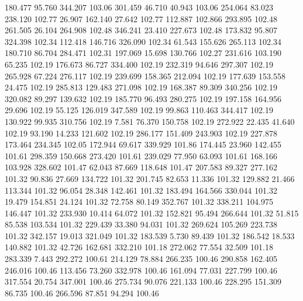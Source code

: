  180.477   95.760  344.207       103.06
 301.459   46.710   40.943       103.06
 254.064   83.023  238.120       102.77
  26.907  162.140   27.642       102.77
 112.887  102.866  293.895       102.48
 261.505   26.104  264.908       102.48
 346.241   23.410  227.673       102.48
 173.832   95.807  324.398       102.34
 112.418  146.716  326.090       102.34
  61.543  155.626  265.113       102.34
 180.710   86.704  284.471       102.31
 197.069   15.698  130.766       102.27
 231.616  103.190   65.235       102.19
 176.673   86.727  334.400       102.19
 232.319   94.646  297.307       102.19
 265.928   67.224  276.117       102.19
 239.699  158.365  212.094       102.19
 177.639  153.558   24.475       102.19
 285.813  129.483  271.098       102.19
 168.387   89.309  340.256       102.19
 320.082   89.297  139.632       102.19
 185.770   96.493  280.275       102.19
 197.158  164.956   29.696       102.19
  55.125  126.019  347.589       102.19
  99.863  110.463  344.417       102.19
 130.922   99.935  310.756       102.19
   7.581   76.370  150.758       102.19
 272.922   22.435   41.640       102.19
  93.190   14.233  121.602       102.19
 286.177  151.409  243.903       102.19
 227.878  173.464  234.345       102.05
 172.944   69.617  339.929       101.86
 174.445   23.960  142.455       101.61
 298.359  150.668  273.420       101.61
 239.029   77.950   63.093       101.61
 168.166  103.928  328.602       101.47
  62.043   87.669  118.648       101.47
 207.583   89.327  277.162       101.32
  90.836   27.669  134.722       101.32
 201.745   82.653   11.336       101.32
 129.882   21.466  113.344       101.32
  96.054   28.348  142.461       101.32
 183.494  164.566  330.044       101.32
  19.479  154.851   24.124       101.32
  72.758   80.149  352.767       101.32
 338.211  104.975  146.447       101.32
 233.930   10.414   64.072       101.32
 152.821   95.494  266.644       101.32
  51.815   85.538  103.534       101.32
 229.439   33.380   94.031       101.32
 269.624  105.269  223.738       101.32
 342.157   19.013  321.049       101.32
 183.539    5.730   89.439       101.32
 186.542   18.533  140.882       101.32
  42.726  162.681  332.210       101.18
 272.062   77.554   32.509       101.18
 283.339    7.443  292.272       100.61
 214.129   78.884  266.235       100.46
 290.858  162.405  246.016       100.46
 113.456   73.260  332.978       100.46
 161.094   77.031  227.799       100.46
 317.554   20.754  347.001       100.46
 275.734   90.076  221.133       100.46
 228.295  151.309   86.735       100.46
 266.596   87.851   94.294       100.46
